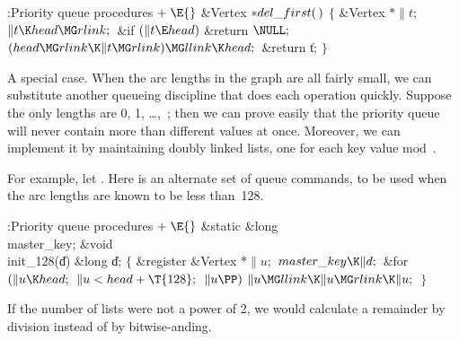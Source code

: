 \B{}:Priority queue procedures\X${}\mathrel+\E{}$\6
\&{Vertex} ${}{*}\\{del\_first}(\,){}$\1\1\2\2\6
${}\{{}$\5
\1\&{Vertex} ${}{*}\|t;{}$\7
${}\|t\K\\{head}\MG\\{rlink};{}$\6
\&{if} ${}(\|t\E\\{head}){}$\1\5
\&{return} ${}\NULL;{}$\2\6
${}(\\{head}\MG\\{rlink}\K\|t\MG\\{rlink})\MG\\{llink}\K\\{head};{}$\6
\&{return} \|t;\6
\4${}\}{}$\2\par
\fi

A special case. When the arc lengths in the graph are all fairly
small,
we can substitute another queueing discipline that does each operation
quickly. Suppose the only lengths are 0, 1, \dots,~; then we
can
prove easily that the priority queue will never contain more than 
different values at once. Moreover, we can implement it by maintaining
 doubly linked lists, one for each key value mod~.

For example, let .  Here is an alternate set of queue
commands,
to be used when the arc lengths are known to be less than~128.

\fi

\B{}:Priority queue procedures\X${}\mathrel+\E{}$\6
\&{static} \&{long} \\{master\_key};\7
\&{void} \\{init\_128}(\|d)\1\1\6
\&{long} \|d;\2\2\6
${}\{{}$\5
\1\&{register} \&{Vertex} ${}{*}\|u;{}$\7
${}\\{master\_key}\K\|d;{}$\6
\&{for} ${}(\|u\K\\{head};{}$ ${}\|u<\\{head}+\T{128};{}$ ${}\|u\PP){}$\1\5
${}\|u\MG\\{llink}\K\|u\MG\\{rlink}\K\|u;{}$\2\6
\4${}\}{}$\2\par
\fi

If the number of lists were not a power of 2, we would calculate a
remainder
by division instead of by bitwise-anding.

